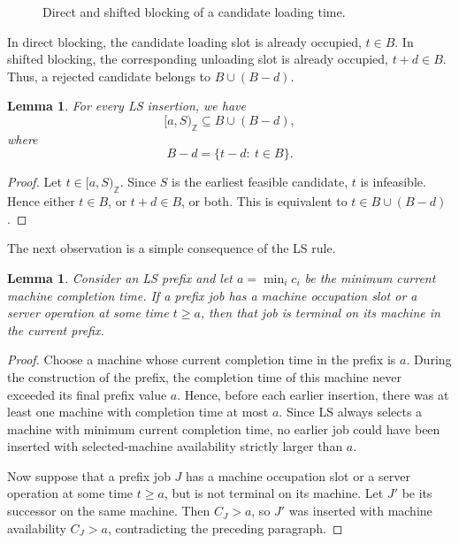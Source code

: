 \documentclass[11pt]{article}
\newtheorem{lemma}[theorem]{Lemma}
\begin{document}
\begin{figure}[H]

\caption{Direct and shifted blocking of a candidate loading time. }
\label{fig:blocking-concept}
\end{figure}

In direct blocking, the candidate loading slot is already occupied, \(t\in B\). In shifted
blocking, the corresponding unloading slot is already occupied, \(t+d\in B\).
Thus, a rejected candidate belongs to \(B\cup(B-d)\).


\begin{lemma}
\label{lem:blocking-cover}
For every LS insertion, we have
\[
        [a,S)_{\mathbb Z}\subseteq B\cup(B-d),
\]
where
\[
        B-d=\{t-d:\ t\in B\}.
\]
\end{lemma}

\begin{proof}
Let \(t\in[a,S)_{\mathbb Z}\). Since \(S\) is the earliest feasible candidate,
\(t\) is infeasible. Hence either \(t\in B\), or \(t+d\in B\), or both. This is
equivalent to \(t\in B\cup(B-d)\).
\end{proof}

The next observation is a simple consequence of the LS rule.

\begin{lemma}
\label{lem:ls-terminal-property-prelim}
Consider an LS prefix and let
$a=\min_i c_i$
be the minimum current machine completion time. If a prefix job has a machine
occupation slot or a server operation at some time \(t\ge a\), then that job is
terminal on its machine in the current prefix.
\end{lemma}

\begin{proof}
Choose a machine whose current completion time in the prefix is \(a\). During
the construction of the prefix, the completion time of this machine never
exceeded its final prefix value \(a\). Hence, before each earlier insertion,
there was at least one machine with completion time at most \(a\). Since LS
always selects a machine with minimum current completion time, no earlier job
could have been inserted with selected-machine availability strictly larger than
\(a\).

Now suppose that a prefix job \(J\) has a machine occupation slot or a server
operation at some time \(t\ge a\), but is not terminal on its machine. Let \(J'\)
be its successor on the same machine. Then \(C_J>a\), so \(J'\) was inserted
with machine availability \(C_J>a\), contradicting the preceding paragraph.
\end{proof}
\end{document}
